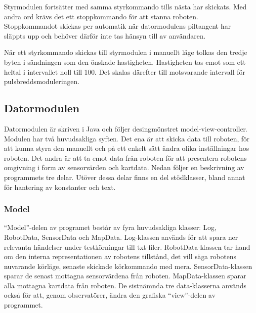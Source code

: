 \documentclass[11pt]{article}
\begin{document}
\begin{flushleft}
\begin{description}[style=unboxed, leftmargin=0cm]
Styrmodulen fortsätter med samma styrkommando tills nästa har skickats. Med andra ord krävs det ett stoppkommando för att stanna roboten. Stoppkommandot skickas per automatik när datormodulens piltangent har släppts upp och behöver därför inte tas hänsyn till av användaren. 

När ett styrkommando skickas till styrmodulen i manuellt läge tolkas den tredje byten i sändningen som den önskade hastigheten. Hastigheten tas emot som ett heltal i intervallet noll till 100. Det skalas därefter till motsvarande intervall för pulsbreddsmoduleringen.

  \end{description}

\subsection{Datormodulen}
Datormodulen är skriven i Java och följer desingmönstret model-view-controller. Modulen har två huvudsakliga syften. Det ena är att skicka data till roboten, för att kunna styra den manuellt och på ett enkelt sätt ändra olika inställningar hos roboten. Det andra är att ta emot data från roboten för att presentera robotens omgivning i form av sensorvärden och kartdata. Nedan följer en beskrivning av programmets tre delar. Utöver dessa delar finns en del stödklasser, bland annat för hantering av konstanter och text.%

\subsubsection{Model}
``Model''-delen av programet består av fyra huvudsakliga klasser: Log, RobotData, SensorData och MapData. 
Log-klassen används för att spara ner relevanta händelser under testkörningar till txt-filer. 
RobotData-klassen tar hand om den interna representationen av robotens tillstånd, det vill säga robotens nuvarande körläge, senaste skickade körkommando med mera. 
SensorData-klassen sparar de senast mottagna sensorvärdena från roboten. 
MapData-klassen sparar alla mottagna kartdata från roboten. De sistnämnda tre data-klasserna används också för att, genom observatörer, ändra den grafiska ``view''-delen av programmet.


\end{flushleft}
\end{document}
